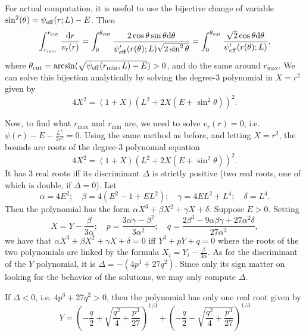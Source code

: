 \documentclass[11pt]{article}
\newcommand{\rr}{\mathrm{r}}
\newcommand{\vr}{v_{\rr}}
\newcommand{\rd}{{\rm{d}}}
\newcommand{\rmax}{r_{\max}}
\newcommand{\rmin}{r_{\min}}
\newcommand{\rcut}{r_{{\rm{cut}}}}
\newcommand{\tcut}{\theta_{{\rm{cut}}}}
\newcommand{\psieff}{\psi_{\rm{eff}}}
\begin{document}
For actual computation, it is useful to use the bijective change of variable $\sin^{2}(\theta) = \psieff(r;L)-E$. Then 
\begin{equation}
  \int_{\rmin}^{\rcut}\frac{{\rd}r}{\vr(r)}=\int_{0}^{\tcut}\frac{2\cos\theta\sin\theta{\rd}\theta}{\psieff'(r(\theta);L)\sqrt{2\sin^{2}\theta}}=\int_{0}^{\tcut}\frac{\sqrt{2}\cos\theta{\rd}\theta}{\psieff'(r(\theta);L)} ,
  \label{eq:change_variable_period}
\end{equation}
where $\tcut = \arcsin({\sqrt{\psieff(\rmin,L)-E}})>0$, and do the same around $\rmax$. We can solve this bijection analytically by solving the degree-3 polynomial in $X=r^{2}$ given by
\begin{equation}
4X^{2}=(1+X)(L^{2}+2X(E+\sin^{2}\theta))^{2} .
\label{eq:bijection_polynomial}
\end{equation}

Now, to find what $\rmax$ and $\rmin$ are, we need to
solve $v_{r}(r)=0$, i.e.  $\psi(r)-E-\frac{L^{2}}{2r^{2}}=0$. Using the same method as before, and letting $X=r^{2}$, the bounds are roots of the degree-3 polynomial equation
\begin{equation}
4X^{2}=(1+X)(L^{2}+2X(E+\sin^{2}\theta))^{2} .
\label{eq:bounds_polynomial}
\end{equation}
It has 3 real roots iff its
discriminant $\Delta$ is strictly positive (two real roots, one of
which is double, if $\Delta=0$).  Let
\begin{equation}
\alpha=4E^{2};\quad\beta=4(E^{2}-1+EL^{2});\quad\gamma=4EL^{2}+L^{4};\quad\delta=L^{4}.
\label{eq:coeff_poly_bound}
\end{equation}
Then the polynomial has the form $\alpha X^{3}+\beta X^{2}+\gamma X+\delta$.
Suppose $E>0$. Setting 
\begin{equation}
X=Y-\frac{\beta}{3\alpha};\quad p=\frac{3\alpha\gamma-\beta^{2}}{3\alpha^{2}};\quad q=\frac{2\beta^{3}-9\alpha\beta\gamma+27\alpha^{2}\delta}{27\alpha^{3}},
\label{eq:Change_poly_variable}
\end{equation}
we have that $\alpha X^{3}+\beta X^{2}+\gamma X+\delta=0$ iff $Y^{3}+pY+q=0$
where the roots of the two polynomials are linked by the formula $X_{i}=Y_{i}-\frac{\beta}{3\alpha}.$
As for the discriminant of the $Y$ polynomial, it is $\Delta=-(4p^{3}+27q^{2})$. Since only its sign matter on looking for the behavior of the solutions,
we may only compute $\Delta$.

If $\Delta<0$, i.e. $4p^{3}+27q^{2}>0$, then the polynomial has
only one real root given by
\begin{equation}
Y=\left(-\frac{q}{2}+\sqrt{\frac{q^{2}}{4}+\frac{p^{3}}{27}}\right)^{1/3}+\left(-\frac{q}{2}-\sqrt{\frac{q^{2}}{4}+\frac{p^{3}}{27}}\right)^{1/3}
\label{eq:Neg_discriminant}
\end{equation}
\end{document}
